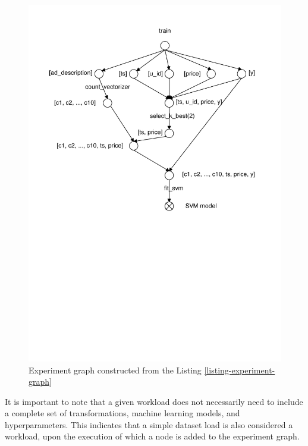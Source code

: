 \begin{figure}
\centering
\includegraphics[width=\columnwidth]{../images/experiment-graph}
\caption{Experiment graph constructed from the Listing \ref{listing-experiment-graph}}
\label{fig-experiment-graph}
\end{figure}

It is important to note that a given workload does not necessarily need to include a complete set of transformations, machine learning models, and hyperparameters.
This indicates that a simple dataset load is also considered a workload, upon the execution of which a node is added to the experiment graph.